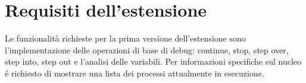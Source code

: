 \section{Requisiti dell'estensione}
Le funzionalità richieste per la prima versione dell'estensione sono l'implementazione delle operazioni di base di debug: continue, stop, step over, step into, step out e l'analisi delle variabili. Per informazioni specifiche sul nucleo é richiesto di mostrare una lista dei processi attualmente in esecuzione.
